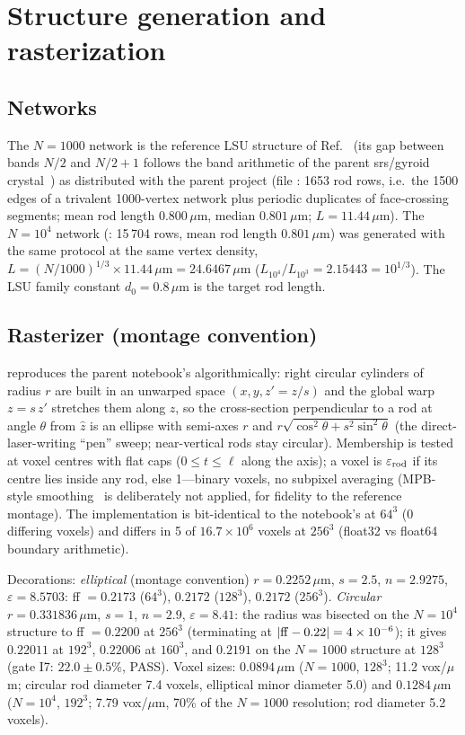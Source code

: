 \documentclass[aps,prl,preprint,superscriptaddress,longbibliography,nofootinbib]{revtex4-2}
\newcommand{\um}{\,\mu\mathrm{m}}
\begin{document}
\section{Structure generation and rasterization}
\subsection{Networks}
The $N=1000$ network is the reference LSU structure of Ref.~\cite{Sellers2017} (its gap between bands $N/2$ and $N/2+1$ follows the band arithmetic of the parent srs/gyroid crystal~\cite{Lu2013}) as distributed with the parent project (file : 1653 rod rows, i.e.\ the 1500 edges of a trivalent 1000-vertex network plus periodic duplicates of face-crossing segments; mean rod length $0.800\um$, median $0.801\um$; $L=11.44\um$). The $N=10^4$ network (: 15\,704 rows, mean rod length $0.801\um$) was generated with the same protocol at the same vertex density, $L=(N/1000)^{1/3}\times11.44\um=24.6467\um$ ($L_{10^4}/L_{10^3}=2.15443=10^{1/3}$). The LSU family constant $d_0=0.8\um$ is the target rod length.

\subsection{Rasterizer (montage convention)}
 reproduces the parent notebook's  algorithmically: right circular cylinders of radius $r$ are built in an unwarped space $(x,y,z'=z/s)$ and the global warp $z=s\,z'$ stretches them along $z$, so the cross-section perpendicular to a rod at angle $\theta$ from $\hat z$ is an ellipse with semi-axes $r$ and $r\sqrt{\cos^2\theta+s^2\sin^2\theta}$ (the direct-laser-writing ``pen'' sweep; near-vertical rods stay circular). Membership is tested at voxel centres with flat caps ($0\le t\le \ell$ along the axis); a voxel is $\varepsilon_{\rm rod}$ if its centre lies inside any rod, else 1---binary voxels, no subpixel averaging (MPB-style smoothing~\cite{Farjadpour2006,Kottke2008} is deliberately not applied, for fidelity to the reference montage). The implementation is bit-identical to the notebook's at $64^3$ (0 differing voxels) and differs in 5 of $16.7\times10^6$ voxels at $256^3$ (float32 vs float64 boundary arithmetic).

Decorations: \emph{elliptical} (montage convention) $r=0.2252\um$, $s=2.5$, $n=2.9275$, $\varepsilon=8.5703$: ff $=0.2173$ ($64^3$), $0.2172$ ($128^3$), $0.2172$ ($256^3$). \emph{Circular} $r=0.331836\um$, $s=1$, $n=2.9$, $\varepsilon=8.41$: the radius was bisected on the $N=10^4$ structure to ff $=0.2200$ at $256^3$ (terminating at $|{\rm ff}-0.22|=4\times10^{-6}$); it gives $0.22011$ at $192^3$, $0.22006$ at $160^3$, and $0.2191$ on the $N=1000$ structure at $128^3$ (gate I7: $22.0\pm0.5\%$, PASS). Voxel sizes: $0.0894\um$ ($N=1000$, $128^3$; 11.2 vox/$\mu$m; circular rod diameter 7.4 voxels, elliptical minor diameter 5.0) and $0.1284\um$ ($N=10^4$, $192^3$; 7.79 vox/$\mu$m, 70\% of the $N=1000$ resolution; rod diameter 5.2 voxels).
\end{document}
